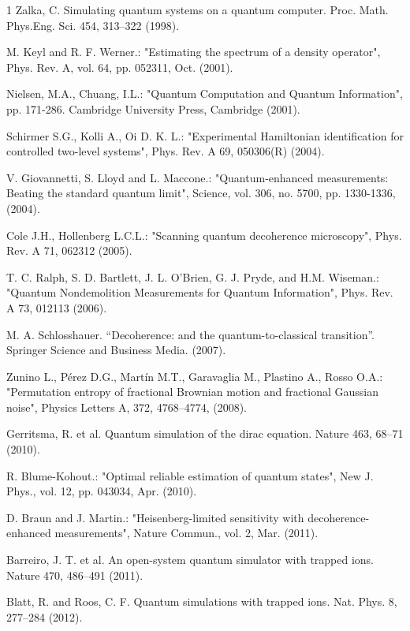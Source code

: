 \documentclass[journal,twocolumn]{IEEEtran}
\begin{document}
\begin{thebibliography}{1}
Zalka, C. Simulating quantum systems on a quantum computer. Proc. Math. Phys.Eng. Sci. 454, 313–322 (1998).

M. Keyl and R. F. Werner.: "Estimating the spectrum of a density operator", Phys. Rev. A, vol. 64, pp. 052311, Oct. (2001).

Nielsen, M.A., Chuang, I.L.: "Quantum Computation and Quantum Information", pp. 171-286. Cambridge University Press, Cambridge (2001).

Schirmer S.G., Kolli A., Oi D. K. L.: "Experimental Hamiltonian identification for controlled two-level systems", Phys. Rev. A 69, 050306(R) (2004).

V. Giovannetti, S. Lloyd and L. Maccone.: "Quantum-enhanced measurements: Beating the standard quantum limit", Science, vol. 306, no. 5700, pp. 1330-1336, (2004).

Cole J.H., Hollenberg L.C.L.: "Scanning quantum decoherence microscopy", Phys. Rev. A 71, 062312 (2005).

T. C. Ralph, S. D. Bartlett, J. L. O’Brien, G. J. Pryde, and H.M. Wiseman.: "Quantum Nondemolition Measurements for Quantum Information", Phys. Rev. A 73, 012113 (2006).

M. A. Schlosshauer. “Decoherence: and the quantum-to-classical transition”. Springer Science and Business Media. (2007).

Zunino L., Pérez D.G., Martín  M.T., Garavaglia  M., Plastino A., Rosso  O.A.: "Permutation entropy of fractional Brownian motion and fractional Gaussian noise", Physics Letters A, 372,  4768–4774, (2008).

Gerritsma, R. et al. Quantum simulation of the dirac equation. Nature 463, 68–71 (2010).

R. Blume-Kohout.: "Optimal reliable estimation of quantum states", New J. Phys., vol. 12, pp. 043034, Apr. (2010).

D. Braun and J. Martin.: "Heisenberg-limited sensitivity with decoherence-enhanced measurements", Nature Commun., vol. 2, Mar. (2011).

Barreiro, J. T. et al. An open-system quantum simulator with trapped ions. Nature 470, 486–491 (2011).

Blatt, R. and Roos, C. F. Quantum simulations with trapped ions. Nat. Phys. 8, 277–284 (2012).


\end{thebibliography}
\end{document}
